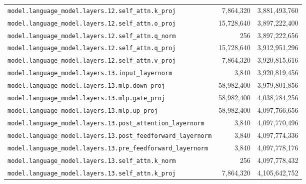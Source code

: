\documentclass[10pt,a4paper]{article}
\theoremstyle{definition}
\begin{document}
\begin{appendices}
\begin{longtable}{p{9.5cm}rr}
\texttt{model.\allowbreak{}language\_model.\allowbreak{}layers.\allowbreak{}12.\allowbreak{}self\_attn.\allowbreak{}k\_proj} & 7,864,320 & 3,881,493,760 \\
\texttt{model.\allowbreak{}language\_model.\allowbreak{}layers.\allowbreak{}12.\allowbreak{}self\_attn.\allowbreak{}o\_proj} & 15,728,640 & 3,897,222,400 \\
\texttt{model.\allowbreak{}language\_model.\allowbreak{}layers.\allowbreak{}12.\allowbreak{}self\_attn.\allowbreak{}q\_norm} & 256 & 3,897,222,656 \\
\texttt{model.\allowbreak{}language\_model.\allowbreak{}layers.\allowbreak{}12.\allowbreak{}self\_attn.\allowbreak{}q\_proj} & 15,728,640 & 3,912,951,296 \\
\texttt{model.\allowbreak{}language\_model.\allowbreak{}layers.\allowbreak{}12.\allowbreak{}self\_attn.\allowbreak{}v\_proj} & 7,864,320 & 3,920,815,616 \\
\texttt{model.\allowbreak{}language\_model.\allowbreak{}layers.\allowbreak{}13.\allowbreak{}input\_layernorm} & 3,840 & 3,920,819,456 \\
\texttt{model.\allowbreak{}language\_model.\allowbreak{}layers.\allowbreak{}13.\allowbreak{}mlp.\allowbreak{}down\_proj} & 58,982,400 & 3,979,801,856 \\
\texttt{model.\allowbreak{}language\_model.\allowbreak{}layers.\allowbreak{}13.\allowbreak{}mlp.\allowbreak{}gate\_proj} & 58,982,400 & 4,038,784,256 \\
\texttt{model.\allowbreak{}language\_model.\allowbreak{}layers.\allowbreak{}13.\allowbreak{}mlp.\allowbreak{}up\_proj} & 58,982,400 & 4,097,766,656 \\
\texttt{model.\allowbreak{}language\_model.\allowbreak{}layers.\allowbreak{}13.\allowbreak{}post\_attention\_layernorm} & 3,840 & 4,097,770,496 \\
\texttt{model.\allowbreak{}language\_model.\allowbreak{}layers.\allowbreak{}13.\allowbreak{}post\_feedforward\_layernorm} & 3,840 & 4,097,774,336 \\
\texttt{model.\allowbreak{}language\_model.\allowbreak{}layers.\allowbreak{}13.\allowbreak{}pre\_feedforward\_layernorm} & 3,840 & 4,097,778,176 \\
\texttt{model.\allowbreak{}language\_model.\allowbreak{}layers.\allowbreak{}13.\allowbreak{}self\_attn.\allowbreak{}k\_norm} & 256 & 4,097,778,432 \\
\texttt{model.\allowbreak{}language\_model.\allowbreak{}layers.\allowbreak{}13.\allowbreak{}self\_attn.\allowbreak{}k\_proj} & 7,864,320 & 4,105,642,752 \\

\end{longtable}
\end{appendices}
\end{document}
